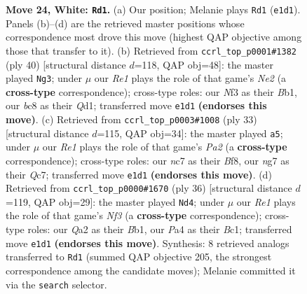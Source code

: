 \documentclass[11pt]{article}
\begin{document}
\begin{figure}[p]
\caption{\textbf{Move 24, White: \texttt{Rd1}.} (a) Our position; Melanie plays \texttt{Rd1} (\texttt{e1d1}). Panels (b)--(d) are the retrieved master positions whose correspondence most drove this move (highest QAP objective among those that transfer to it). (b) Retrieved from \texttt{ccrl\_top\_p0001\#1382} (ply 40) [structural distance $d$=118, QAP obj=48]: the master played \texttt{Ng3}; under $\mu$ our \emph{Re1} plays the role of that game's \emph{Ne2} (a \textbf{cross-type} correspondence); cross-type roles: our \emph{N}f3 as their \emph{B}b1, our \emph{b}c8 as their \emph{Q}d1; transferred move \texttt{e1d1} \textbf{(endorses this move)}. (c) Retrieved from \texttt{ccrl\_top\_p0003\#1008} (ply 33) [structural distance $d$=115, QAP obj=34]: the master played \texttt{a5}; under $\mu$ our \emph{Re1} plays the role of that game's \emph{Pa2} (a \textbf{cross-type} correspondence); cross-type roles: our \emph{n}c7 as their \emph{B}f8, our \emph{n}g7 as their \emph{Q}c7; transferred move \texttt{e1d1} \textbf{(endorses this move)}. (d) Retrieved from \texttt{ccrl\_top\_p0000\#1670} (ply 36) [structural distance $d$=119, QAP obj=29]: the master played \texttt{Nd4}; under $\mu$ our \emph{Re1} plays the role of that game's \emph{Nf3} (a \textbf{cross-type} correspondence); cross-type roles: our \emph{Q}a2 as their \emph{B}b1, our \emph{P}a4 as their \emph{B}c1; transferred move \texttt{e1d1} \textbf{(endorses this move)}. Synthesis: 8 retrieved analogs transferred to \texttt{Rd1} (summed QAP objective 205, the strongest correspondence among the candidate moves); Melanie committed it via the \texttt{search} selector.}
\label{fig:thought-m46}
\end{figure}

\clearpage
\end{document}
